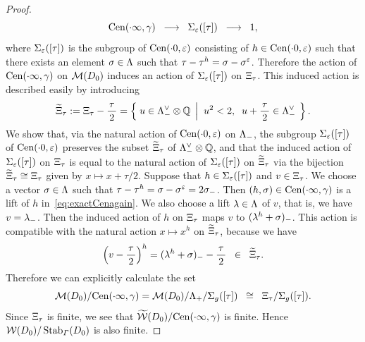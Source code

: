 \documentclass{amsart} %
\begin{document}
\begin{proof}
\begin{equation}
\mathrm{Cen}(\cdot \infty, \gamma)
\;\; \longrightarrow \;\; 
\Sigma_{\varepsilon}([\tau])
\;\; \longrightarrow \;\; 1,
\end{equation}
%
where $\Sigma_{\varepsilon}([\tau])$ is the subgroup of $\mathrm{Cen}(\cdot 0, \varepsilon)$
consisting of $h\in \mathrm{Cen}(\cdot 0, \varepsilon)$ such that 
there exists an element $\sigma\in \Lambda$ such that $\tau-\tau^h=\sigma-\sigma^{\varepsilon}$.
Therefore the action 
of $\mathrm{Cen}(\cdot \infty, \gamma)$ on $\mathord{\mathcal{M}}(D_0)$ induces an action of 
$\Sigma_{\varepsilon}([\tau])$ on $\Xi_{\tau}$. 
This induced action is described easily by introducing 
%
\begin{equation}\label{eq:tilXi}
\widetilde{\Xi}_{\tau}:=\Xi_{\tau} -\dfrac{\tau}{\,2\,}
=\left\{\; {u\in \Lambda_{-}^{\vee}\otimes\mathord{\mathbb{Q}}} \; \left\vert \; {\;u^2<2, \;\; u+\dfrac{\tau}{\,2\,}\in \Lambda_{-}^{\vee}} \; \right.\right \}.
\end{equation}
%
We show that, via the natural action of $\mathrm{Cen}(\cdot 0, \varepsilon)$ on $\Lambda_{-}$,
the subgroup 
$\Sigma_{\varepsilon}([\tau])$ of $\mathrm{Cen}(\cdot 0, \varepsilon)$
preserves the subset $\widetilde{\Xi}_{\tau}$ of $\Lambda_{-}^{\vee}\otimes\mathord{\mathbb{Q}}$,
and that 
the induced action of 
$\Sigma_{\varepsilon}([\tau])$ on $\Xi_{\tau}$
is equal to the natural action of $\Sigma_{\varepsilon}([\tau])$ on $\widetilde{\Xi}_{\tau}$
via the 
bijection $\widetilde{\Xi}_{\tau}\cong \Xi_{\tau}$ given by 
$x\mapsto x+\tau/2$.
Suppose that $h\in \Sigma_{\varepsilon}([\tau])$ and $v\in \Xi_{\tau}$.
We choose a vector $\sigma\in \Lambda$ such that $\tau-\tau^h=\sigma-\sigma^\varepsilon=2\sigma_{-}$.
Then $(h, \sigma)\in \mathrm{Cen}(\cdot \infty, \gamma)$ is a lift of $h$ in~\eqref{eq:exactCenagain}.
We also choose a lift $\lambda\in \Lambda$ of $v$,
that is, we have $v=\lambda\sb{-}$.
Then the induced action of $h$ on $\Xi_{\tau}$ maps $v$ to $(\lambda^h+\sigma)\sb{-}$.
This action is compatible with the natural action $x\mapsto x^h$ on $\widetilde{\Xi}_{\tau}$, because we have 
\[
\left(v-\dfrac{\tau}{\,2\,}\right)^h=(\lambda^h+\sigma)_{-}-\dfrac{\tau}{\,2\,}\;\;\in\;\;\widetilde{\Xi}_{\tau}.
\]
Therefore we can explicitly calculate  the set 
%
\begin{equation}\label{eq:orbitss}
 \mathord{\mathcal{M}}(D_0)/\mathrm{Cen}(\cdot \infty, \gamma)= \mathord{\mathcal{M}}(D_0)/\Lambda_{+}/\Sigma_{g}([\tau])\;\;\cong\;\; \Xi_{\tau}/\Sigma_{g}([\tau]). 
\end{equation}
%
Since $\Xi_{\tau}$ is finite, 
we see that 
$\widetilde{\mathord{\mathcal{W}}}(D_0)/\mathrm{Cen}(\cdot \infty, \gamma)$ is finite. 
Hence  $\mathord{\mathcal{W}}(D_0)/\operatorname{Stab}_{\varGamma}(D_0)$ is also finite. 
%
\end{proof}
%
\end{document}
